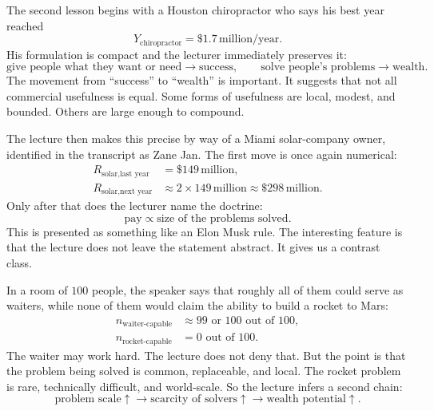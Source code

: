 The second lesson begins with a Houston chiropractor who says his best year reached
\begin{equation}
Y_{\text{chiropractor}} = \$1.7\,\text{million/year}.
\end{equation}
His formulation is compact and the lecturer immediately preserves it:
\begin{equation}
\text{give people what they want or need} \to \text{success},
\qquad
\text{solve people's problems} \to \text{wealth}.
\end{equation}
The movement from ``success'' to ``wealth'' is important. It suggests that not all commercial usefulness is equal. Some forms of usefulness are local, modest, and bounded. Others are large enough to compound.

The lecture then makes this precise by way of a Miami solar-company owner, identified in the transcript as Zane Jan. The first move is once again numerical:
\begin{align}
R_{\text{solar,last year}} &= \$149\,\text{million}, \\
R_{\text{solar,next year}} &\approx 2\times 149\,\text{million}
\approx \$298\,\text{million}.
\end{align}
Only after that does the lecturer name the doctrine:
\begin{equation}
\text{pay} \propto \text{size of the problems solved}.
\end{equation}
This is presented as something like an Elon Musk rule. The interesting feature is that the lecture does not leave the statement abstract. It gives us a contrast class.

In a room of \(100\) people, the speaker says that roughly all of them could serve as waiters, while none of them would claim the ability to build a rocket to Mars:
\begin{align}
n_{\text{waiter-capable}} &\approx 99\text{ or }100 \text{ out of }100, \\
n_{\text{rocket-capable}} &= 0 \text{ out of }100.
\end{align}
The waiter may work hard. The lecture does not deny that. But the point is that the problem being solved is common, replaceable, and local. The rocket problem is rare, technically difficult, and world-scale. So the lecture infers a second chain:
\begin{equation}
\text{problem scale}\uparrow \to \text{scarcity of solvers}\uparrow \to \text{wealth potential}\uparrow.
\end{equation}

